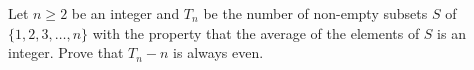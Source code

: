Let $n \geq 2$ be an integer and $T_n$ be the number of non-empty
subsets $S$ of $\{1, 2, 3, \dots, n\}$ with the property that the
average of the elements of $S$ is an integer. Prove that
$T_n - n$ is always even.
